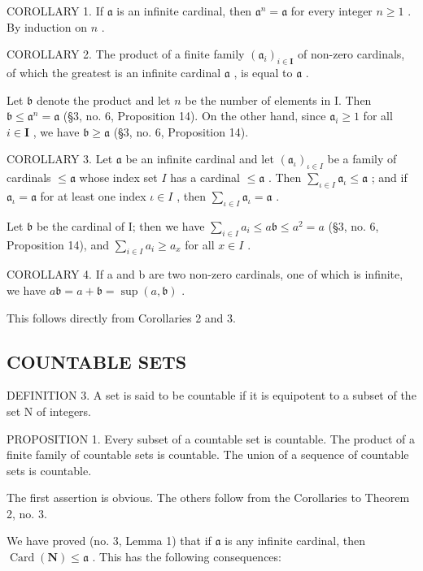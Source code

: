 COROLLARY 1. If \(\mathfrak{a}\) is an infinite cardinal, then \(\mathfrak{a}^n = \mathfrak{a}\) for every integer \(n \geqslant 1\) . By induction on \(n\) .

COROLLARY 2. The product of a finite family \((\mathfrak{a}_i)_{i\in \mathbf{I}}\) of non-zero cardinals, of which the greatest is an infinite cardinal \(\mathfrak{a}\) , is equal to \(\mathfrak{a}\) .

Let \(\mathfrak{b}\) denote the product and let \(n\) be the number of elements in I. Then \(\mathfrak{b} \leqslant \mathfrak{a}^n = \mathfrak{a}\) (§3, no. 6, Proposition 14). On the other hand, since \(\mathfrak{a}_i \geqslant 1\) for all \(i \in \mathbf{I}\) , we have \(\mathfrak{b} \geqslant \mathfrak{a}\) (§3, no. 6, Proposition 14).

COROLLARY 3. Let \(\mathfrak{a}\) be an infinite cardinal and let \((\mathfrak{a}_{\iota})_{\iota \in I}\) be a family of cardinals \(\leqslant \mathfrak{a}\) whose index set \(I\) has a cardinal \(\leqslant \mathfrak{a}\) . Then \(\sum_{\iota \in I} \mathfrak{a}_{\iota} \leqslant \mathfrak{a}\) ; and if \(\mathfrak{a}_{\iota} = \mathfrak{a}\) for at least one index \(\iota \in I\) , then \(\sum_{\iota \in I} \mathfrak{a}_{\iota} = \mathfrak{a}\) .

Let \(\mathfrak{b}\) be the cardinal of I; then we have \(\sum_{i\in I}a_i\leqslant a\mathfrak{b}\leqslant a^2 = a\) (§3, no. 6, Proposition 14), and \(\sum_{i\in I}a_i\geqslant a_x\) for all \(x\in I\) .

COROLLARY 4. If a and b are two non-zero cardinals, one of which is infinite, we have \(a\mathfrak{b} = a + \mathfrak{b} = \sup(a, \mathfrak{b})\) .

This follows directly from Corollaries 2 and 3.

\subsection{COUNTABLE SETS}

DEFINITION 3. A set is said to be countable if it is equipotent to a subset of the set N of integers.

PROPOSITION 1. Every subset of a countable set is countable. The product of a finite family of countable sets is countable. The union of a sequence of countable sets is countable.

The first assertion is obvious. The others follow from the Corollaries to Theorem 2, no. 3.

We have proved (no. 3, Lemma 1) that if \(\mathfrak{a}\) is any infinite cardinal, then \(\operatorname{Card}(\mathbf{N}) \leqslant \mathfrak{a}\) . This has the following consequences:

